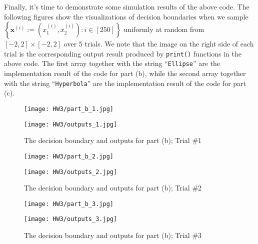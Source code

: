 \documentclass[11pt]{article}
\begin{document}
\indent Finally, it's time to demonstrate some simulation results of the above code. The following figures show the visualizations of decision boundaries when we sample $\left\{ \mathbf{x}^{(i)} := \left( x_{1}^{(i)}, x_{2}^{(i)} \right) : i \in [250] \right\}$ uniformly at random from $\left[ -2, 2 \right] \times \left[ -2, 2 \right]$ over 5 trials. We note that the image on the right side of each trial is the corresponding output result produced by \texttt{print()} functions in the above code. The first array together with the string ``\texttt{Ellipse}'' are the implementation result of the code for part (b), while the second array together with the string ``\texttt{Hyperbola}'' are the implementation result of the code for part (c).
\begin{figure}
    \begin{minipage}{0.48\textwidth}
        \centering
        \texttt{[image: HW3/part\_b\_1.jpg]}
    \end{minipage}
    \begin{minipage}{0.48\textwidth}
        \centering
        \texttt{[image: HW3/outputs\_1.jpg]}
    \end{minipage}
    \caption{The decision boundary and outputs for part (b); Trial \#1}
    \label{fig:part_b_1}
\end{figure}
\begin{figure}
    \begin{minipage}{0.48\textwidth}
        \centering
        \texttt{[image: HW3/part\_b\_2.jpg]}
    \end{minipage}
    \begin{minipage}{0.48\textwidth}
        \centering
        \texttt{[image: HW3/outputs\_2.jpg]}
    \end{minipage}
    \caption{The decision boundary and outputs for part (b); Trial \#2}
    \label{fig:part_b_2}
\end{figure}
\begin{figure}
    \begin{minipage}{0.48\textwidth}
        \centering
        \texttt{[image: HW3/part\_b\_3.jpg]}
    \end{minipage}
    \begin{minipage}{0.48\textwidth}
        \centering
        \texttt{[image: HW3/outputs\_3.jpg]}
    \end{minipage}
    \caption{The decision boundary and outputs for part (b); Trial \#3}
    \label{fig:part_b_3}
\end{figure}
\end{document}
